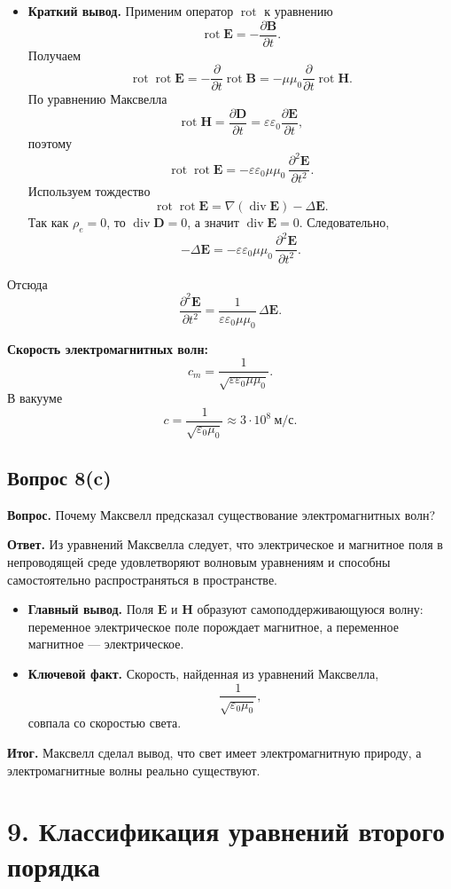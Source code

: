 \documentclass[a4paper,12pt]{article}
\newcommand{\diver}{\operatorname{div}}
\newcommand{\rot}{\operatorname{rot}}
\newcommand{\Question}[2]{\subsection*{Вопрос #1}\textbf{Вопрос.} #2}
\newcommand{\Answer}{\textbf{Ответ.}}
\begin{document}
\begin{itemize}
  \item \textbf{Краткий вывод.} Применим оператор $\rot$ к уравнению
  \[
  \rot\mathbf{E}=-\frac{\partial\mathbf{B}}{\partial t}.
  \]
  Получаем
  \[
  \rot\rot\mathbf{E}
  =-\frac{\partial}{\partial t}\rot\mathbf{B}
  =-\mu\mu_0\frac{\partial}{\partial t}\rot\mathbf{H}.
  \]
  По уравнению Максвелла
  \[
  \rot\mathbf{H}=\frac{\partial\mathbf{D}}{\partial t}
  =\varepsilon\varepsilon_0\frac{\partial\mathbf{E}}{\partial t},
  \]
  поэтому
  \[
  \rot\rot\mathbf{E}
  =-\varepsilon\varepsilon_0\mu\mu_0\,\frac{\partial^2\mathbf{E}}{\partial t^2}.
  \]
  Используем тождество
  \[
  \rot\rot\mathbf{E}=\nabla(\diver\mathbf{E})-\Delta\mathbf{E}.
  \]
  Так как $\rho_e=0$, то $\diver\mathbf{D}=0$, а значит $\diver\mathbf{E}=0$. Следовательно,
  \[
  -\Delta\mathbf{E}
  =-\varepsilon\varepsilon_0\mu\mu_0\,\frac{\partial^2\mathbf{E}}{\partial t^2}.
  \]
\end{itemize}

Отсюда
\[
\frac{\partial^2\mathbf{E}}{\partial t^2}
=
\frac{1}{\varepsilon\varepsilon_0\mu\mu_0}\,\Delta\mathbf{E}.
\]

\textbf{Скорость электромагнитных волн:}
\[
c_m=\frac{1}{\sqrt{\varepsilon\varepsilon_0\mu\mu_0}}.
\]
В вакууме
\[
c=\frac{1}{\sqrt{\varepsilon_0\mu_0}}\approx 3\cdot 10^8\ \text{м/с}.
\]

\Question{8(c)}{Почему Максвелл предсказал существование электромагнитных волн?}

\Answer
Из уравнений Максвелла следует, что электрическое и магнитное поля
в непроводящей среде удовлетворяют волновым уравнениям
и способны самостоятельно распространяться в пространстве.

\begin{itemize}
  \item \textbf{Главный вывод.} Поля $\mathbf{E}$ и $\mathbf{H}$ образуют самоподдерживающуюся волну: переменное электрическое поле порождает магнитное, а переменное магнитное --- электрическое.
  \item \textbf{Ключевой факт.} Скорость, найденная из уравнений Максвелла,
  \[
  \frac{1}{\sqrt{\varepsilon_0\mu_0}},
  \]
  совпала со скоростью света.
\end{itemize}

\textbf{Итог.} Максвелл сделал вывод, что свет имеет электромагнитную природу, а электромагнитные волны реально существуют.

\section*{9. Классификация уравнений второго порядка}
\end{document}
